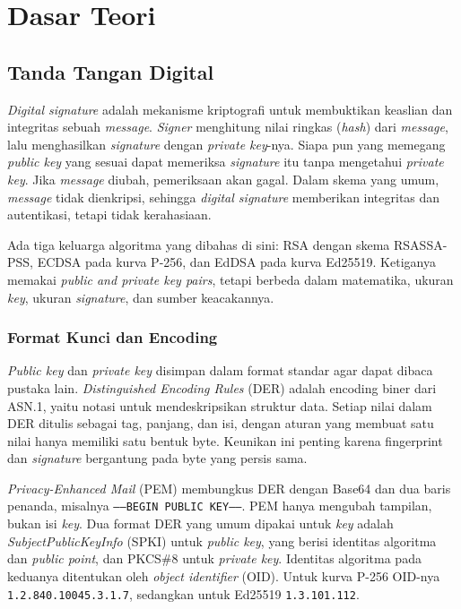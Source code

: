 \section{Dasar Teori}

\subsection{Tanda Tangan Digital}
\textit{Digital signature} adalah mekanisme kriptografi untuk membuktikan keaslian dan integritas
sebuah \textit{message}. \textit{Signer} menghitung nilai ringkas (\textit{hash}) dari \textit{message}, lalu
menghasilkan \textit{signature} dengan \textit{private key}-nya. Siapa pun yang memegang \textit{public key} yang
sesuai dapat memeriksa \textit{signature} itu tanpa mengetahui \textit{private key}. Jika \textit{message} diubah,
pemeriksaan akan gagal. Dalam skema yang umum, \textit{message} tidak dienkripsi, sehingga \textit{digital signature} memberikan integritas dan autentikasi, tetapi tidak kerahasiaan.

Ada tiga keluarga algoritma yang dibahas di sini: RSA dengan skema RSASSA-PSS, ECDSA pada
kurva P-256, dan EdDSA pada kurva Ed25519. Ketiganya memakai \textit{public and private key pairs},
tetapi berbeda dalam matematika, ukuran \textit{key}, ukuran \textit{signature}, dan sumber keacakannya.

\subsubsection{Format Kunci dan Encoding}
\textit{Public key} dan \textit{private key} disimpan dalam format standar agar dapat dibaca pustaka lain.
\textit{Distinguished Encoding Rules} (DER) adalah encoding biner dari ASN.1, yaitu notasi
untuk mendeskripsikan struktur data. Setiap nilai dalam DER ditulis sebagai tag, panjang, dan
isi, dengan aturan yang membuat satu nilai hanya memiliki satu bentuk byte. Keunikan ini
penting karena fingerprint dan \textit{signature} bergantung pada byte yang persis sama.

\textit{Privacy-Enhanced Mail} (PEM) membungkus DER dengan Base64 dan dua baris penanda, misalnya
\texttt{-----BEGIN PUBLIC KEY-----}. PEM hanya mengubah tampilan, bukan isi \textit{key}. Dua format
DER yang umum dipakai untuk \textit{key} adalah \textit{SubjectPublicKeyInfo} (SPKI) untuk \textit{public key},
yang berisi identitas algoritma dan \textit{public point}, dan PKCS\#8 untuk \textit{private key}. Identitas
algoritma pada keduanya ditentukan oleh \textit{object identifier} (OID). Untuk kurva P-256
OID-nya \texttt{1.2.840.10045.3.1.7}, sedangkan untuk Ed25519 \texttt{1.3.101.112}.

